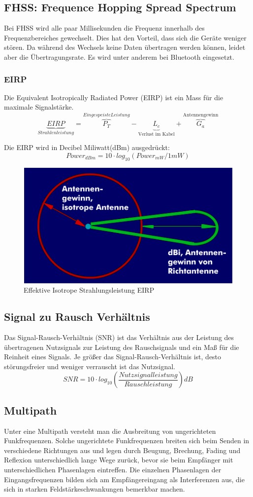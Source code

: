 \subsection{FHSS: Frequence Hopping Spread Spectrum}
Bei FHSS wird alle paar Millisekunden die Frequenz innerhalb des Frequenzbereiches gewechselt. Dies hat den Vorteil, dass sich die Geräte weniger stören. Da während des Wechsels keine Daten übertragen werden können, leidet aber die Übertragungsrate. Es wird unter anderem bei Bluetooth eingesetzt.

\subsubsection{EIRP}
Die Equivalent Isotropically Radiated Power (EIRP) ist ein Mass für die maximale Signalstärke.
\[
	\underbrace{EIRP}_{Strahlenleistung} = \overbrace{P_T}^{Eingespeiste Leistung} - \underbrace{L_c}_\text{Verlust im Kabel} + \overbrace{G_a}^\text{Antennengewinn}
\]

Die EIRP wird in Decibel Miliwatt(dBm)  ausgedrückt:
\[
Power_{dBm} = 10 \cdot log_{10}(Power_{mW}/1mW)
\]	
	
\begin{figure}[h]
\centering
\includegraphics[width=0.5\linewidth]{images/eirp}
\caption{Effektive Isotrope Strahlungsleistung EIRP}
\label{fig:eirp}
\end{figure}

\subsection{Signal zu Rausch Verhältnis}
Das Signal-Rausch-Verhältnis (SNR) ist das Verhältnis aus der Leistung des übertragenen Nutzsignals zur Leistung des Rauschsignals und ein Maß für die Reinheit eines Signals. Je größer das Signal-Rausch-Verhältnis ist, desto störungsfreier und weniger verrauscht ist das Nutzsignal. 
\[
	SNR = 10 \cdot log_{10}(\frac{Nutzsignalleistung}{Rauschleistung}) dB
\]

\subsection{Multipath}
Unter eine Multipath versteht man die Ausbreitung von ungerichteten Funkfrequenzen. Solche ungerichtete Funkfrequenzen breiten sich beim Senden in verschiedene Richtungen aus und legen durch Beugung, Brechung, Fading und Reflexion unterschiedlich lange Wege zurück, bevor sie beim Empfänger mit unterschiedlichen Phasenlagen eintreffen. Die einzelnen Phasenlagen der Eingangsfrequenzen bilden sich am Empfängereingang als Interferenzen aus, die sich in starken Feldstärkeschwankungen bemerkbar machen. 

